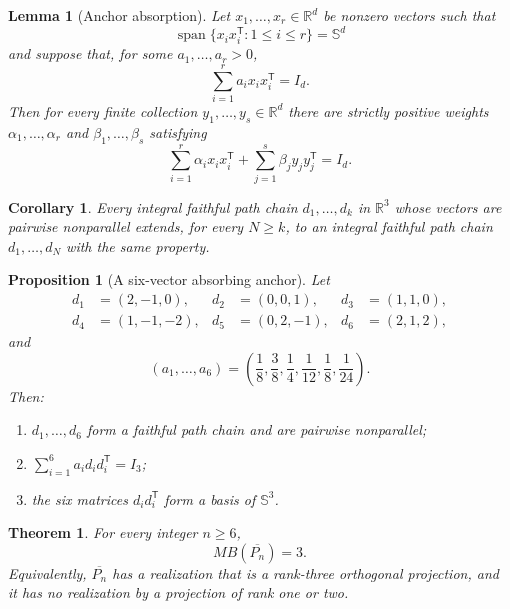 \documentclass[10pt,a4paper]{amsart}
\newtheorem{theorem}{Theorem}
\newtheorem{proposition}{Proposition}
\newtheorem{lemma}{Lemma}
\newtheorem{corollary}{Corollary}
\newcommand{\R}{\mathbb{R}}
\newcommand{\Sn}{\mathbb{S}}
\newcommand{\Span}{\operatorname{span}}
\begin{document}
\begin{lemma}[Anchor absorption]\label{lem:absorption}
Let $x_1,\ldots,x_r\in\R^d$ be nonzero vectors such that
\[
 \Span\{x_i x_i^{\mathsf T}:1\le i\le r\}=\Sn^d
 \tag{2.1}\label{eq:span}
\]
and suppose that, for some $a_1,\ldots,a_r>0$,
\[
       \sum_{i=1}^r a_i x_i x_i^{\mathsf T}=I_d.
 \tag{2.2}\label{eq:anchorparseval}
\]
Then for every finite collection $y_1,\ldots,y_s\in\R^d$ there are strictly
positive weights $\alpha_1,\ldots,\alpha_r$ and
$\beta_1,\ldots,\beta_s$ satisfying
\[
 \sum_{i=1}^r \alpha_i x_i x_i^{\mathsf T}
 +\sum_{j=1}^s \beta_j y_j y_j^{\mathsf T}=I_d.
 \tag{2.3}\label{eq:absorbed}
\]
\end{lemma}

\begin{corollary}\label{cor:extend}
Every integral faithful path chain $d_1,\ldots,d_k$ in $\R^3$ whose vectors
are pairwise nonparallel extends, for every $N\ge k$, to an integral
faithful path chain $d_1,\ldots,d_N$ with the same property.
\end{corollary}

\begin{proposition}[A six-vector absorbing anchor]\label{prop:anchor}
Let
\[
\begin{aligned}
 d_1&=(2,-1,0),      & d_2&=(0,0,1),       & d_3&=(1,1,0),\\
 d_4&=(1,-1,-2),     & d_5&=(0,2,-1),      & d_6&=(2,1,2),
\end{aligned}
\tag{4.1}\label{eq:seedvectors}
\]
and
\[
 (a_1,\ldots,a_6)
 =\left(\frac18,\frac38,\frac14,\frac1{12},\frac18,\frac1{24}\right).
\tag{4.2}\label{eq:seedweights}
\]
Then:
\begin{enumerate}[label=\textup{(\roman*)}]
\item $d_1,\ldots,d_6$ form a faithful path chain and are pairwise
      nonparallel;
\item $\sum_{i=1}^6 a_i d_i d_i^{\mathsf T}=I_3$;
\item the six matrices $d_i d_i^{\mathsf T}$ form a basis of $\Sn^3$.
\end{enumerate}
\end{proposition}

\begin{theorem}\label{thm:main}
For every integer $n\ge6$,
\[
             MB(\overline{P_n})=3.
\]
Equivalently, $\overline{P_n}$ has a realization that is a rank-three
orthogonal projection, and it has no realization by a projection of rank
one or two.
\end{theorem}
\end{document}
